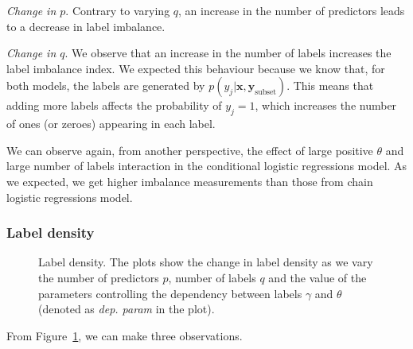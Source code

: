 \documentclass[review]{elsarticle}
\begin{document}
{		\emph{Change in $p$}. Contrary to varying $q$, an increase in the number of predictors leads to a decrease in label imbalance.
		
		\emph{Change in $q$}. We observe that an increase in the number of labels increases the label imbalance index. We expected this behaviour because we know that, for both models, the labels are generated by $p(y_{j}|\mathbf{x},\mathbf{y}_{\mathrm{subset}})$. This means that adding more labels affects the probability of $y_{j}=1$, which increases the number of ones (or zeroes) appearing in each label.
		
		We can observe again, from another perspective, the effect of large positive $\theta$ and large number of labels interaction in the conditional logistic regressions model. As we expected, we get higher imbalance measurements than those from chain logistic regressions model.
		
		\subsubsection{Label density}
		
		\begin{figure}[H]
			\begin{center}
			\end{center}
			\caption{Label density. The plots show the change in label density as we vary the number of predictors $p$, number of labels $q$ and the value of the parameters controlling the dependency between labels $\gamma$ and $\theta$ (denoted as \emph{dep. param} in the plot).}
			\label{fig:results:density}
		\end{figure}
		
		From Figure~\ref{fig:results:density}, we can make three observations.
		
}
\end{document}
